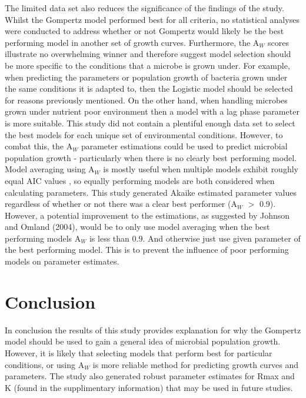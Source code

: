 \documentclass[11pt]{article}
\begin{document}
The limited data set also reduces the significance of the findings of the study. Whilst the Gompertz model performed best for all criteria, no statistical analyses were conducted to address whether or not Gompertz would likely be the best performing model in another set of growth curves. Furthermore, the $\mathrm{A}_{\textit{W}}$ scores illustrate no overwhelming winner and therefore suggest model selection should be more specific to the conditions that a microbe is grown under. For example, when predicting the parameters or population growth of bacteria grown under the same conditions it is adapted to, then the Logistic model should be selected for reasons previously mentioned. On the other hand, when handling microbes grown under nutrient poor environment then a model with a lag phase parameter is more suitable. This study did not contain a plentiful enough data set to select the best models for each unique set of environmental conditions. However, to combat this, the $\mathrm{A}_{\textit{W}}$ parameter estimations could be used to predict microbial population growth - particularly when there is no clearly best performing model. Model averaging using $\mathrm{A}_{\textit{W}}$ is mostly useful when multiple models exhibit roughly equal AIC values \cite{JOHNSON2004101}, so equally performing models are both considered when calculating parameters. This study generated Akaike estimated parameter values regardless of whether or not there was a clear best performer ($\mathrm{A}_{\textit{W}}$ $>$ 0.9). However, a potential improvement to the estimations, as suggested by Johnson and Omland (2004), would be to only use model averaging when the best performing models $\mathrm{A}_{\textit{W}}$ is less than 0.9. And otherwise just use given parameter of the best performing model. This is to prevent the influence of poor performing models on parameter estimates.

\section{Conclusion}
In conclusion the results of this study provides explanation for why the Gompertz model should be used to gain a general idea of microbial population growth. However, it is likely that selecting models that perform best for particular conditions, or using $\mathrm{A}_{\textit{W}}$ is more reliable method for predicting growth curves and parameters. The study also generated robust parameter estimates for Rmax and K (found in the supplimentary information) that may be used in future studies.

  
  
  

  
\end{document}
